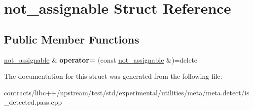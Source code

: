 \hypertarget{structnot__assignable}{}\section{not\+\_\+assignable Struct Reference}
\label{structnot__assignable}
\subsection*{Public Member Functions}
\begin{DoxyCompactItemize}
\item 
\mbox{\label{structnot__assignable_a430d00311e66f05031a2032b718bb41d}} 
\mbox{\hyperlink{structnot__assignable}{not\+\_\+assignable}} \& {\bfseries operator=} (const \mbox{\hyperlink{structnot__assignable}{not\+\_\+assignable}} \&)=delete
\end{DoxyCompactItemize}


The documentation for this struct was generated from the following file\+:\begin{DoxyCompactItemize}
\item 
contracts/libc++/upstream/test/std/experimental/utilities/meta/meta.\+detect/is\+\_\+detected.\+pass.\+cpp\end{DoxyCompactItemize}
